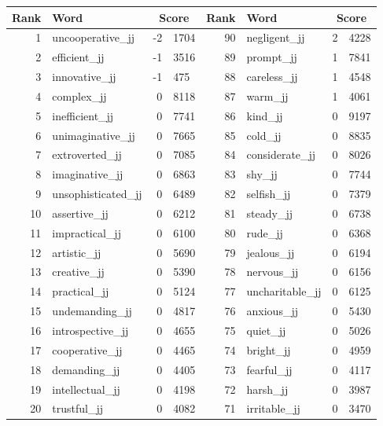 \begin{table}[tbp]
    \begin{tabular}{| rlr@{.}l | rlr@{.}l |}
    \hline
    \textbf{Rank} & \textbf{Word} & \multicolumn{2}{c|}{\textbf{Score}} & \textbf{Rank} & \textbf{Word} & \multicolumn{2}{c|}{\textbf{Score}} \\
    \hline
    1 & uncooperative\_jj & -2 & 1704    &    90 & negligent\_jj & 2 & 4228 \\
    2 & efficient\_jj & -1 & 3516    &    89 & prompt\_jj & 1 & 7841 \\
    3 & innovative\_jj & -1 & 475    &    88 & careless\_jj & 1 & 4548 \\
    4 & complex\_jj & 0 & 8118    &    87 & warm\_jj & 1 & 4061 \\
    5 & inefficient\_jj & 0 & 7741    &    86 & kind\_jj & 0 & 9197 \\
    6 & unimaginative\_jj & 0 & 7665    &    85 & cold\_jj & 0 & 8835 \\
    7 & extroverted\_jj & 0 & 7085    &    84 & considerate\_jj & 0 & 8026 \\
    8 & imaginative\_jj & 0 & 6863    &    83 & shy\_jj & 0 & 7744 \\
    9 & unsophisticated\_jj & 0 & 6489    &    82 & selfish\_jj & 0 & 7379 \\
    10 & assertive\_jj & 0 & 6212    &    81 & steady\_jj & 0 & 6738 \\
    11 & impractical\_jj & 0 & 6100    &    80 & rude\_jj & 0 & 6368 \\
    12 & artistic\_jj & 0 & 5690    &    79 & jealous\_jj & 0 & 6194 \\
    13 & creative\_jj & 0 & 5390    &    78 & nervous\_jj & 0 & 6156 \\
    14 & practical\_jj & 0 & 5124    &    77 & uncharitable\_jj & 0 & 6125 \\
    15 & undemanding\_jj & 0 & 4817    &    76 & anxious\_jj & 0 & 5430 \\
    16 & introspective\_jj & 0 & 4655    &    75 & quiet\_jj & 0 & 5026 \\
    17 & cooperative\_jj & 0 & 4465    &    74 & bright\_jj & 0 & 4959 \\
    18 & demanding\_jj & 0 & 4405    &    73 & fearful\_jj & 0 & 4117 \\
    19 & intellectual\_jj & 0 & 4198    &    72 & harsh\_jj & 0 & 3987 \\
    20 & trustful\_jj & 0 & 4082    &    71 & irritable\_jj & 0 & 3470 \\

\end{tabular}
\end{table}
